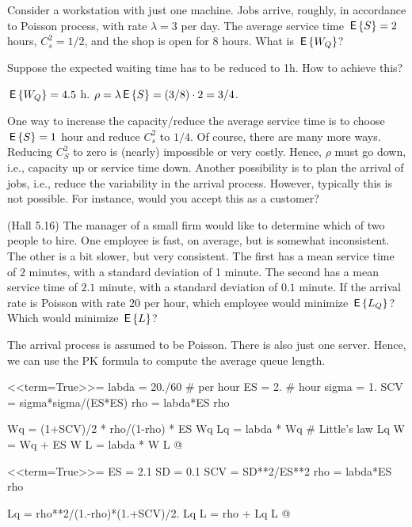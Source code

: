 \begin{exercise}
  Consider a workstation with just one machine. Jobs arrive, roughly,
  in accordance to Poisson process, with rate $\lambda=3$ per day. The
  average service time $\,\mathsf{E}\left\{S\right\} = 2$ hours, $C^2_s = 1/2$, and the shop
  is open for 8 hours. What is $\,\mathsf{E}\left\{W_Q\right\}$?

 Suppose the expected waiting time has to be reduced to 1h. How
  to achieve this? 
\begin{solution}
  $\,\mathsf{E}\left\{W_Q\right\} = 4.5$ h. $\rho = \lambda \,\mathsf{E}\left\{S\right\} = (3/8)\cdot 2 = 3/4$.

 One way to increase the capacity/reduce the average service
    time is to choose $\,\mathsf{E}\left\{S\right\} =1$ hour and reduce $C^2_s$ to $1/4$.  Of
    course, there are many more ways. Reducing $C^2_S$ to zero is
    (nearly) impossible or very costly. Hence, $\rho$ must go down,
    i.e., capacity up or service time down. Another possibility is to
    plan the arrival of jobs, i.e., reduce the variability in the
    arrival process. However, typically this is not possible. For
    instance, would you accept this as a customer?
\end{solution}
\end{exercise}


\begin{exercise}
  (Hall 5.16) The manager of a small firm would like to determine
  which of two people to hire. One employee is fast, on average, but
  is somewhat inconsistent. The other is a bit slower, but very
  consistent. The first has a mean service time of $2$ minutes, with a
  standard deviation of 1 minute. The second has a mean service time
  of $2.1$ minute, with a standard deviation of $0.1$ minute. If the arrival rate is Poisson with rate 20 per hour, which employee would minimize $\,\mathsf{E}\left\{L_Q\right\}$? Which would minimize $\,\mathsf{E}\left\{L\right\}$? 
  \begin{solution}
    The arrival process is assumed to be Poisson. There is also
    just one server. Hence, we can use the PK formula to compute the average queue length.

<<term=True>>=
labda = 20./60 # per hour
ES = 2. # hour
sigma = 1.
SCV = sigma*sigma/(ES*ES)
rho = labda*ES
rho

Wq = (1+SCV)/2 * rho/(1-rho) * ES
Wq
Lq = labda * Wq # Little's law
Lq
W = Wq + ES
W
L = labda * W
L
@ 


<<term=True>>=
ES = 2.1
SD = 0.1
SCV = SD**2/ES**2
rho = labda*ES
rho

Lq = rho**2/(1.-rho)*(1.+SCV)/2.
Lq
L = rho + Lq
L
@ 

  \end{solution}
\end{exercise}


